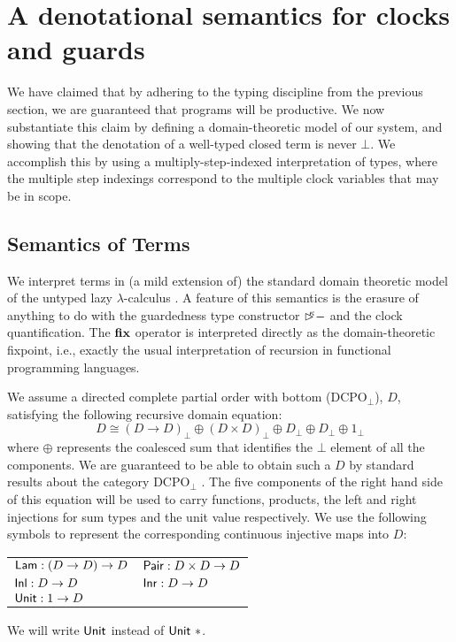 \section{A denotational semantics for clocks and guards}
\label{sec:semantics}

We have claimed that by adhering to the typing discipline from the
previous section, we are guaranteed that programs will be
productive. We now substantiate this claim by defining a
domain-theoretic model of our system, and showing that the denotation
of a well-typed closed term is never $\bot$. We accomplish this by
using a multiply-step-indexed interpretation of types, where the
multiple step indexings correspond to the multiple clock variables
that may be in scope.

\subsection{Semantics of Terms}
\label{sec:semantics-of-programs}

We interpret terms in (a mild extension of) the standard domain
theoretic model of the untyped lazy $\lambda$-calculus
\cite{PittsAM:compavm}. A feature of this semantics is the erasure of
anything to do with the guardedness type constructor $\mathord{\rhd\kern-0.4em^{\kappa}}-$
and the clock quantification. The $\textbf{fix}$ operator is interpreted
directly as the domain-theoretic fixpoint, i.e., exactly the usual
interpretation of recursion in functional programming languages.

We assume a directed complete partial order with bottom
($\mathrm{DCPO}_\bot$), $D$, satisfying the following recursive domain
equation:
\begin{displaymath}
  D \cong (D \to D)_\bot \oplus (D \times D)_\bot \oplus D_\bot \oplus D_\bot \oplus 1_\bot
\end{displaymath}
where $\oplus$ represents the coalesced sum that identifies the $\bot$
element of all the components. We are guaranteed to be able to obtain
such a $D$ by standard results about the category $\mathrm{DCPO}_\bot$
\cite{smythplotkin}. The five components of the right hand side of
this equation will be used to carry functions, products, the left and
right injections for sum types and the unit value respectively. We use
the following symbols to represent the corresponding continuous
injective maps into $D$:
\begin{center}
  \begin{tabular}{ll}
    $\mathsf{Lam} : (D \to D) \to D$ & $\mathsf{Pair} : D \times D \to D$ \\
    $\mathsf{Inl} : D \to D$ & $\mathsf{Inr} : D \to D$ \\
    $\mathsf{Unit} : 1 \to D$
  \end{tabular}  
\end{center}
We will write $\mathsf{Unit}$ instead of $\mathsf{Unit}\ *$.

